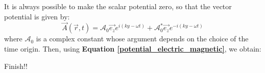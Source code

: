 It is always possible to make the scalar potential zero, so that the vector potential is given by:
\begin{equation}
    \vec A(\vec r, t) = \mathcal{A}_0 \vec{e_z}e^{i(ky-\omega t)} + \mathcal{A}_0^* \vec{e_z}e^{-i(ky-\omega t)}
\end{equation}
where $\mathcal{A}_0$ is a complex constant whose argument depends on the choice of the time origin. Then, using \textbf{Equation \ref{potential_electric_magnetic}}, we obtain:


{\color{red}Finish!!}

